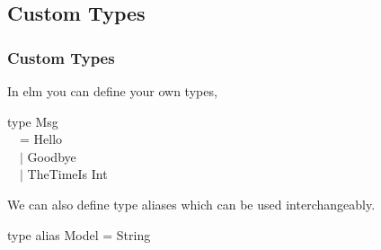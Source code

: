 \subsection{Custom Types}
    \begin{frame}

        \frametitle{Custom Types}
        In elm you can define your own types,
        \newline
        \begin{codeexample}
            type Msg\\
                $\quad$= Hello\\
                $\quad\vert$ Goodbye \\
                $\quad\vert$ TheTimeIs  Int\\
        \end{codeexample}
        We can also define type aliases which can be used interchangeably.
        \newline
        \begin{codeexample}
            type alias Model = String\newline
        \end{codeexample}

    \end{frame}
